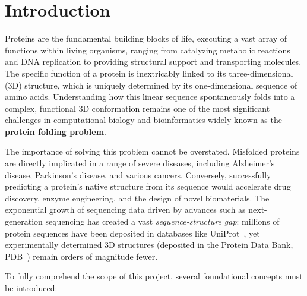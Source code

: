\chapter{Introduction}
\label{chap:introduction}

Proteins are the fundamental building blocks of life, executing a vast array of functions within living organisms, ranging from catalyzing metabolic reactions and DNA replication to providing structural support and transporting molecules. The specific function of a protein is inextricably linked to its three-dimensional (3D) structure, which is uniquely determined by its one-dimensional sequence of amino acids. Understanding how this linear sequence spontaneously folds into a complex, functional 3D conformation remains one of the most significant challenges in computational biology and bioinformatics widely known as the \textbf{protein folding problem}.

The importance of solving this problem cannot be overstated. Misfolded proteins are directly implicated in a range of severe diseases, including Alzheimer's disease, Parkinson's disease, and various cancers. Conversely, successfully predicting a protein's native structure from its sequence would accelerate drug discovery, enzyme engineering, and the design of novel biomaterials. The exponential growth of sequencing data driven by advances such as next-generation sequencing has created a vast \textit{sequence-structure gap}: millions of protein sequences have been deposited in databases like UniProt~\cite{uniprot2023}, yet experimentally determined 3D structures (deposited in the Protein Data Bank, PDB~\cite{berman2000protein}) remain orders of magnitude fewer.

To fully comprehend the scope of this project, several foundational concepts must be introduced:

